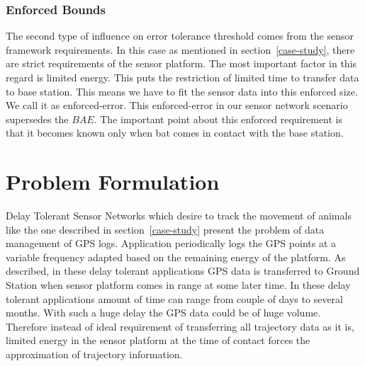 \documentclass[conference]{IEEEtran}
\begin{document}
\subsubsection{Enforced Bounds}
The second type of influence on error tolerance threshold comes from the sensor framework requirements. 
In this case as mentioned in section~\ref{case-study}, there are strict requirements of the sensor platform. 
The most important factor in this regard is limited energy. This puts the restriction of limited time to 
transfer data to base station. This means we have to fit the sensor data into this enforced size. We 
call it as enforced-error. This enforced-error in our sensor network scenario supersedes the $BAE$. 
%
The important point about this enforced requirement is that it becomes known only when bat comes 
in contact with the base station. 
\section{Problem Formulation}\label{sec:problem}

Delay Tolerant Sensor Networks which desire to track the movement of animals like the one described in 
section~\ref{case-study} present the problem of data management of GPS logs. Application periodically 
logs the GPS points at a variable frequency adapted based on the remaining energy of the platform. 
As described, in these delay tolerant applications GPS data is transferred to Ground Station when 
sensor platform comes in range at some later time. In these delay tolerant applications amount of time 
can range from couple of days to several months. With such a huge delay the GPS data could be of huge 
volume. Therefore instead of ideal requirement of transferring all trajectory data as it is, limited energy in 
the sensor platform at the time of contact forces the approximation of trajectory information. \\
\end{document}
